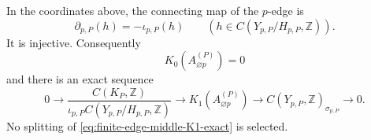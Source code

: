 \begin{theorem}
\label{thm:full-finite-edge-boundary-map}
In the coordinates above, the connecting map of the \(p\)-edge is
\begin{equation}
 \partial_{p,P}(h)=-\iota_{p,P}(h)
 \qquad
 (h\in C(Y_{p,P}/H_{p,P},\mathbb Z)).
 \label{eq:full-finite-edge-boundary-map}
\end{equation}
It is injective.  Consequently
\begin{equation}
 K_0(A_{\varnothing p}^{(P)})=0
 \label{eq:finite-edge-middle-K0-zero}
\end{equation}
and there is an exact sequence
\begin{equation}
 0\longrightarrow
 \frac{C(K_P,\mathbb Z)}
      {\iota_{p,P}C(Y_{p,P}/H_{p,P},\mathbb Z)}
 \longrightarrow K_1(A_{\varnothing p}^{(P)})
 \longrightarrow C(Y_{p,P},\mathbb Z)_{\sigma_{p,P}}
 \longrightarrow0.
 \label{eq:finite-edge-middle-K1-exact}
\end{equation}
No splitting of \eqref{eq:finite-edge-middle-K1-exact} is selected.
\end{theorem}

